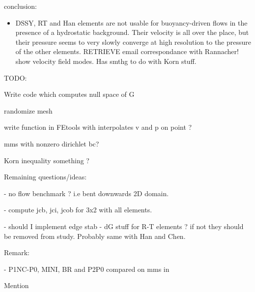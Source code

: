 conclusion:

\begin{itemize}
\item DSSY, RT and Han elements are not usable for buoyancy-driven flows in the presence of a hydrostatic 
background. Their velocity is all over the place, but their pressure seems to very slowly 
converge at high resolution to the pressure of the other elements.
RETRIEVE email correspondance with Rannacher! show velocity field modes. Has smthg to do with 
Korn stuff.
\end{itemize}















\newpage
TODO:

Write code which computes null space of G 

randomize mesh

write function in FEtools with interpolates v and p on point ?

mms with nonzero dirichlet bc?

Korn inequality something ?



Remaining questions/ideas:

- no flow benchmark ? i.e bent downwards 2D domain. 

- compute jcb, jci, jcob for 3x2 with all elements.

- should I implement edge stab - dG stuff for R-T elements ? if not they should be  
removed from study. Probably same with Han and Chen.

Remark:

- P1NC-P0, MINI, BR and P2P0 compared on mms in \cite{cakp15}

Mention  
